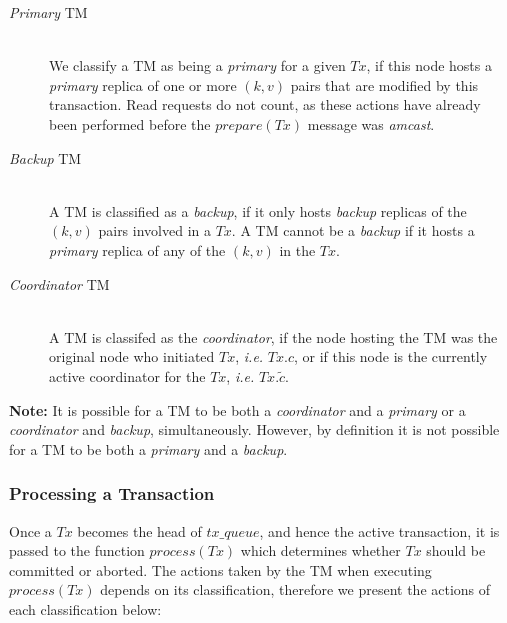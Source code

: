     \begin{description}
        \item[\emph{Primary} TM] \hfill \\
            We classify a TM as being a \emph{primary} for a given $Tx$, if this node hosts a \emph{primary} replica of one or more $(k,v)$ pairs that are modified by this transaction.  Read requests do not count, as these actions have already been performed before the $prepare(Tx)$ message was \emph{amcast}.  
            
        \item[\emph{Backup} TM] \hfill \\
        A TM is classified as a \emph{backup}, if it only hosts \emph{backup} replicas of the $(k, v)$ pairs involved in a $Tx$.  A TM cannot be a \emph{backup} if it hosts a \emph{primary} replica of any of the $(k,v)$ in the $Tx$.  
        
        \item[\emph{Coordinator} TM] \hfill \\
        A TM is classifed as the \emph{coordinator}, if the node hosting the TM was the original node who initiated $Tx$, \emph{i.e.} $Tx.c$, or if this node is the currently active coordinator for the $Tx$, \emph{i.e.} $Tx.\tilde{c}$.  
    \end{description}
    
    \textbf{Note:} It is possible for a TM to be both a \emph{coordinator} and a \emph{primary} or a \emph{coordinator} and \emph{backup}, simultaneously.  However, by definition it is not possible for a TM to be both a \emph{primary} and a \emph{backup}.
    
    \subsubsection*{Processing a Transaction}
    Once a $Tx$ becomes the head of $tx\_queue$, and hence the active transaction, it is passed to the function $process(Tx)$ which determines whether $Tx$ should be committed or aborted.  The actions taken by the TM when executing $process(Tx)$ depends on its classification, therefore we present the actions of each classification below:
    
